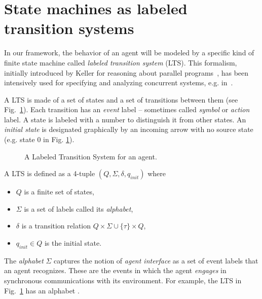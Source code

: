 \section{State machines as labeled transition systems\label{section:background-state-machines}}

In our framework, the behavior of an agent will be modeled by a specific kind of finite state machine called \emph{labeled transition system} (LTS). This formalism, initially introduced by Keller for reasoning about parallel programs~\cite{Keller:1976}, has been intensively used for specifying and analyzing concurrent systems, e.g. in~\cite{Milner:1989, Clarke:1989, Magee:1997}. 

A LTS is made of a set of states and a set of transitions between them (see Fig.~\ref{image:framework-start-stop}). Each transition has an \emph{event} label -- sometimes called \emph{symbol} or \emph{action} label. A state is labeled with a number to distinguish it from other states. An \emph{initial state} is designated graphically by an incoming arrow with no source state (e.g. state 0 in Fig. \ref{image:framework-start-stop}). 

\begin{figure}
\centering{}
  \caption{A Labeled Transition System for an  agent\label{image:framework-start-stop}.}
\end{figure}

\begin{definition}
A LTS is defined as a 4-tuple $(Q,\Sigma,\delta,q_{init})$ where
\begin{itemize}
\item $Q$ is a finite set of states,
\item $\Sigma$ is a set of labels called its \emph{alphabet}, 
\item $\delta$ is a transition relation $Q \times \Sigma\cup\{\tau\} \times Q$,
\item $q_{init} \in Q$ is the initial state. 
\end{itemize}
\end{definition}

The \emph{alphabet} $\Sigma$ captures the notion of \emph{agent interface} as a set of event labels that an agent recognizes. These are the events in which the agent \emph{engages} in synchronous communications with its environment. For example, the LTS in Fig.~\ref{image:framework-start-stop} has an alphabet . 

